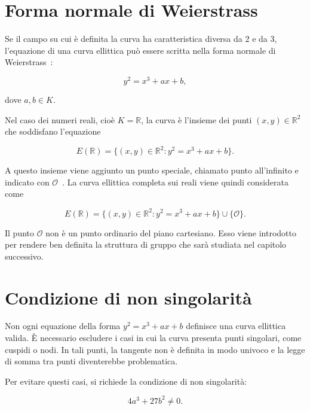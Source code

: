 \documentclass[12pt,a4paper,oneside]{report}
\begin{document}
\section{Forma normale di Weierstrass}

Se il campo su cui è definita la curva ha caratteristica diversa da \(2\) e da \(3\), l'equazione di una curva ellittica può essere scritta nella forma normale di Weierstrass~\cite{margara_ec,sec1}:

\begin{equation}
    y^2 = x^3 + ax + b,
    \label{eq:weierstrass}
\end{equation}

dove \(a,b \in K\).

Nel caso dei numeri reali, cioè \(K=\mathbb{R}\), la curva è l'insieme dei punti \((x,y) \in \mathbb{R}^2\) che soddisfano l'equazione

\begin{equation}
    E(\mathbb{R}) = \{(x,y) \in \mathbb{R}^2 : y^2 = x^3 + ax + b\}.
\end{equation}

A questo insieme viene aggiunto un punto speciale, chiamato punto all'infinito e indicato con \(\mathcal{O}\)~\cite{margara_ec}. La curva ellittica completa sui reali viene quindi considerata come

\begin{equation}
    E(\mathbb{R}) = \{(x,y) \in \mathbb{R}^2 : y^2 = x^3 + ax + b\} \cup \{\mathcal{O}\}.
\end{equation}

Il punto \(\mathcal{O}\) non è un punto ordinario del piano cartesiano. Esso viene introdotto per rendere ben definita la struttura di gruppo che sarà studiata nel capitolo successivo.

\section{Condizione di non singolarità}

Non ogni equazione della forma \(y^2 = x^3 + ax + b\) definisce una curva ellittica valida. È necessario escludere i casi in cui la curva presenta punti singolari, come cuspidi o nodi. In tali punti, la tangente non è definita in modo univoco e la legge di somma tra punti diventerebbe problematica.

Per evitare questi casi, si richiede la condizione di non singolarità:

\begin{equation}
    4a^3 + 27b^2 \neq 0.
    \label{eq:nonsingular}
\end{equation}
\end{document}
